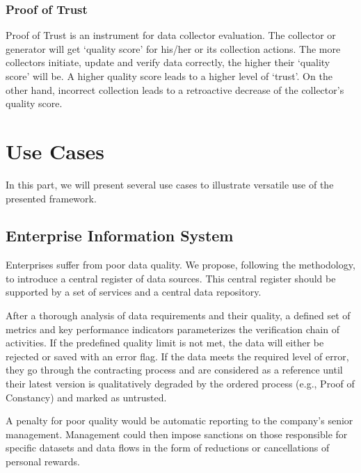 \subsubsection{Proof of Trust}

Proof of Trust is an instrument for data collector evaluation.
The collector or generator will get \enquote*{quality score} for his/her or its collection actions.
The more collectors initiate, update and verify data correctly, the higher their \enquote*{quality score} will be.
A higher quality score leads to a higher level of \enquote*{trust}.
On the other hand, incorrect collection leads to a retroactive decrease of the collector's quality score.

\section{Use Cases}

In this part, we will present several use cases to illustrate versatile use of the presented framework.

\subsection{Enterprise Information System}

Enterprises suffer from poor data quality.
We propose, following the methodology, to introduce a central register of data sources.
This central register should be supported by a set of services and a central data repository.

After a thorough analysis of data requirements and their quality, a defined set of metrics and key performance indicators parameterizes the verification chain of activities.
If the predefined quality limit is not met, the data will either be rejected or saved with an error flag.
If the data meets the required level of error, they go through the contracting process and are considered as a reference until their latest version is qualitatively degraded by the ordered process (e.g., Proof of Constancy) and marked as untrusted.

A penalty for poor quality would be automatic reporting to the company's senior management.
Management could then impose sanctions on those responsible for specific datasets and data flows in the form of reductions or cancellations of personal rewards.

